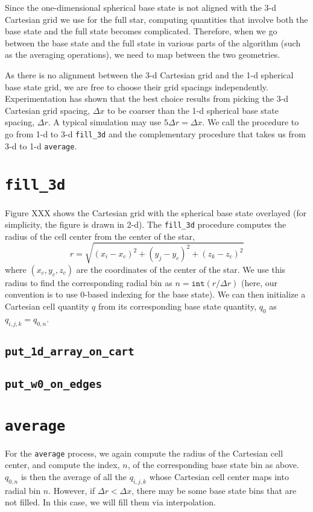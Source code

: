 Since the one-dimensional spherical base state is not aligned with the
3-d Cartesian grid we use for the full star, computing quantities that
involve both the base state and the full state becomes complicated.
Therefore, when we go between the base state and the full state in
various parts of the algorithm (such as the averaging operations), we
need to map between the two geometries.

As there is no alignment between the 3-d Cartesian grid and the 1-d
spherical base state grid, we are free to choose their grid spacings
independently.  Experimentation has shown that the best choice results
from picking the 3-d Cartesian grid spacing, $\Delta x$ to be coarser
than the 1-d spherical base state spacing, $\Delta r$.  A typical simulation
may use $5 \Delta r = \Delta x$.
We call the procedure to go from 1-d to 3-d {\tt fill\_3d} and the
complementary procedure that takes us from 3-d to 1-d {\tt average}.
\section{\tt fill\_3d}
Figure XXX shows the Cartesian grid with the spherical
base state overlayed (for simplicity, the figure is drawn in 2-d).  
The {\tt fill\_3d} procedure computes the radius of the cell center
from the center of the star,
\begin{equation}
r = \sqrt{(x_i - x_c)^2 + (y_j - y_c)^2 + (z_k - z_c)^2}
\end{equation}
where $(x_c, y_c, z_c)$ are the coordinates of the center of the star.
We use this radius to find the corresponding radial bin as $n = \mathtt{int}(r
/ \Delta r)$ (here, our convention is to use 0-based indexing for the
base state).  We can then initialize a Cartesian cell quantity $q$ from its
corresponding base state quantity, $q_0$ as $q_{i,j,k} = q_{0,n}$.
\subsection{\tt put\_1d\_array\_on\_cart}
\subsection{\tt put\_w0\_on\_edges}
\section{\tt average}
For the {\tt average} process, we again compute the radius of the
Cartesian cell center, and compute the index, $n$, of the
corresponding base state bin as above.  $q_{0,n}$ is then the average
of all the $q_{i,j,k}$ whose Cartesian cell center maps into radial
bin $n$.  However, if $\Delta r < \Delta x$, there may be some base
state bins that are not filled.  In this case, we will fill them via
interpolation. 
